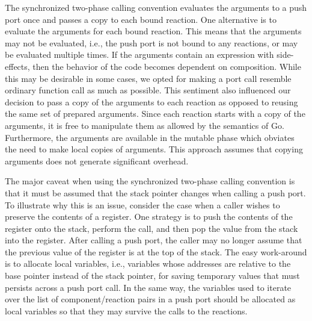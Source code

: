 The synchronized two-phase calling convention evaluates the arguments to a push port once and passes a copy to each bound reaction.
One alternative is to evaluate the arguments for each bound reaction.
This means that the arguments may not be evaluated, i.e., the push port is not bound to any reactions, or may be evaluated multiple times.
If the arguments contain an expression with side-effects, then the behavior of the code becomes dependent on composition.
While this may be desirable in some cases, we opted for making a port call resemble ordinary function call as much as possible.
This sentiment also influenced our decision to pass a copy of the arguments to each reaction as opposed to reusing the same set of prepared arguments.
Since each reaction starts with a copy of the arguments, it is free to manipulate them as allowed by the semantics of Go.
Furthermore, the arguments are available in the mutable phase which obviates the need to make local copies of arguments.
This approach assumes that copying arguments does not generate significant overhead.


The major caveat when using the synchronized two-phase calling convention is that it must be assumed that the stack pointer changes when calling a push port.
To illustrate why this is an issue, consider the case when a caller wishes to preserve the contents of a register.
One strategy is to push the contents of the register onto the stack, perform the call, and then pop the value from the stack into the register.
After calling a push port, the caller may no longer assume that the previous value of the register is at the top of the stack.
The easy work-around is to allocate local variables, i.e., variables whose addresses are relative to the base pointer instead of the stack pointer, for saving temporary values that must persists across a push port call.
In the same way, the variables used to iterate over the list of component/reaction pairs in a push port should be allocated as local variables so that they may survive the calls to the reactions.

